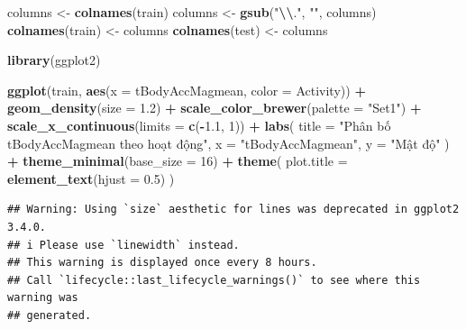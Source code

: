 \documentclass[
]{article}
\newenvironment{Shaded}{\begin{snugshade}}{\end{snugshade}}
\newcommand{\AttributeTok}[1]{\textcolor[rgb]{0.13,0.29,0.53}{#1}}
\newcommand{\DecValTok}[1]{\textcolor[rgb]{0.00,0.00,0.81}{#1}}
\newcommand{\FloatTok}[1]{\textcolor[rgb]{0.00,0.00,0.81}{#1}}
\newcommand{\FunctionTok}[1]{\textcolor[rgb]{0.13,0.29,0.53}{\textbf{#1}}}
\newcommand{\NormalTok}[1]{#1}
\newcommand{\OtherTok}[1]{\textcolor[rgb]{0.56,0.35,0.01}{#1}}
\newcommand{\SpecialCharTok}[1]{\textcolor[rgb]{0.81,0.36,0.00}{\textbf{#1}}}
\newcommand{\StringTok}[1]{\textcolor[rgb]{0.31,0.60,0.02}{#1}}
\begin{document}
\begin{Shaded}
\begin{Highlighting}[]
\NormalTok{columns }\OtherTok{\textless{}{-}} \FunctionTok{colnames}\NormalTok{(train)}
\NormalTok{columns }\OtherTok{\textless{}{-}} \FunctionTok{gsub}\NormalTok{(}\StringTok{"}\SpecialCharTok{\textbackslash{}\textbackslash{}}\StringTok{."}\NormalTok{, }\StringTok{""}\NormalTok{, columns)}
\FunctionTok{colnames}\NormalTok{(train) }\OtherTok{\textless{}{-}}\NormalTok{ columns}
\FunctionTok{colnames}\NormalTok{(test) }\OtherTok{\textless{}{-}}\NormalTok{ columns}
\end{Highlighting}
\end{Shaded}

\begin{Shaded}
\begin{Highlighting}[]
\FunctionTok{library}\NormalTok{(ggplot2)}

\FunctionTok{ggplot}\NormalTok{(train, }\FunctionTok{aes}\NormalTok{(}\AttributeTok{x =}\NormalTok{ tBodyAccMagmean, }\AttributeTok{color =}\NormalTok{ Activity)) }\SpecialCharTok{+}
  \FunctionTok{geom\_density}\NormalTok{(}\AttributeTok{size =} \FloatTok{1.2}\NormalTok{) }\SpecialCharTok{+}
  \FunctionTok{scale\_color\_brewer}\NormalTok{(}\AttributeTok{palette =} \StringTok{"Set1"}\NormalTok{) }\SpecialCharTok{+}
  \FunctionTok{scale\_x\_continuous}\NormalTok{(}\AttributeTok{limits =} \FunctionTok{c}\NormalTok{(}\SpecialCharTok{{-}}\FloatTok{1.1}\NormalTok{, }\DecValTok{1}\NormalTok{)) }\SpecialCharTok{+} 
  \FunctionTok{labs}\NormalTok{(}
    \AttributeTok{title =} \StringTok{"Phân bố tBodyAccMagmean theo hoạt động"}\NormalTok{,}
    \AttributeTok{x =} \StringTok{"tBodyAccMagmean"}\NormalTok{,}
    \AttributeTok{y =} \StringTok{"Mật độ"}
\NormalTok{  ) }\SpecialCharTok{+}
  \FunctionTok{theme\_minimal}\NormalTok{(}\AttributeTok{base\_size =} \DecValTok{16}\NormalTok{) }\SpecialCharTok{+}
  \FunctionTok{theme}\NormalTok{(}
    \AttributeTok{plot.title =} \FunctionTok{element\_text}\NormalTok{(}\AttributeTok{hjust =} \FloatTok{0.5}\NormalTok{)}
\NormalTok{  )}
\end{Highlighting}
\end{Shaded}

\begin{verbatim}
## Warning: Using `size` aesthetic for lines was deprecated in ggplot2 3.4.0.
## i Please use `linewidth` instead.
## This warning is displayed once every 8 hours.
## Call `lifecycle::last_lifecycle_warnings()` to see where this warning was
## generated.
\end{verbatim}
\end{document}
